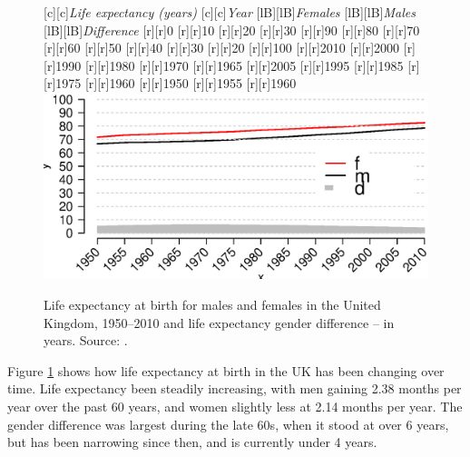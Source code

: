 \documentclass[11 pt, a4paper]{report}
\begin{document}
\begin{figure}[hbtp!]
[c][c]{\small{\emph{Life expectancy (years)}}}
[c][c]{\small{\emph{Year}}}
[lB][lB]{\small{\emph{Females}}}
[lB][lB]{\small{\emph{Males}}}
[lB][lB]{\small{\emph{Difference}}}
[r][r]{\small{0}}
[r][r]{\small{10}}
[r][r]{\small{20}}
[r][r]{\small{30}}
[r][r]{\small{90}}
[r][r]{\small{80}}
[r][r]{\small{70}}
[r][r]{\small{60}}
[r][r]{\small{50}}
[r][r]{\small{40}}
[r][r]{\small{30}}
[r][r]{\small{20}}
[r][r]{\small{100}}
[r][r]{\small{2010}}
[r][r]{\small{2000}}
[r][r]{\small{1990}}
[r][r]{\small{1980}}
[r][r]{\small{1970}}
[r][r]{\small{1965}}
[r][r]{\small{2005}}
[r][r]{\small{1995}}
[r][r]{\small{1985}}
[r][r]{\small{1975}}
[r][r]{\small{1960}}
[r][r]{\small{1950}}
[r][r]{\small{1955}}
[r][r]{\small{1960}}
\includegraphics[width=\textwidth]{../figures/Fig2.1.eps}
\caption{Life expectancy at birth for males and females in the United Kingdom, 1950--2010 and life expectancy gender difference -- in years. Source: \citet{HMD2015}.}
\label{Fig:07}
\end{figure}

Figure \ref{Fig:07} shows how life expectancy at birth in the UK has been changing over time. Life expectancy been steadily increasing, with men gaining 2.38 months per year over the past 60 years, and women slightly less at 2.14 months per year. The gender difference was largest during the late 60s, when it stood at over 6 years, but has been narrowing since then, and is currently under 4 years.
\end{document}

